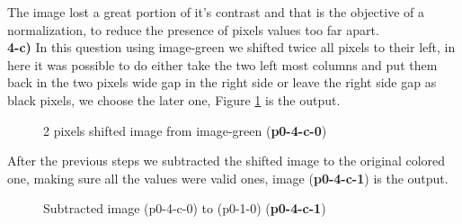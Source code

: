 \documentclass[12pt,a4paper]{article}
\begin{document}
The image lost a great portion of it's contrast and that is the objective of a normalization, to reduce the presence of pixels values too far apart.\\


\textbf{4-c) } In this question using image-green we shifted twice all pixels to their left, in here it was possible to do either take the two left most columns and put them back in the two pixels wide gap in the right side or leave the right side gap as black pixels, we choose the later one, Figure \ref{fig:p0-4-c-0} is the output.

\begin{figure}[!h]
	\centering
	{%
		\setlength{\fboxsep}{1pt}%
		\setlength{\fboxrule}{1pt}%
	}%
	\caption{2 pixels shifted image from image-green (\textbf{p0-4-c-0})}
	\label{fig:p0-4-c-0}
\end{figure}

After the previous steps we subtracted the shifted image to the original colored one, making sure all the values were valid ones, image (\textbf{p0-4-c-1}) is the output.

\begin{figure}[!h]
	\centering
	{%
		\setlength{\fboxsep}{1pt}%
		\setlength{\fboxrule}{1pt}%
	}%
	\caption{Subtracted image (p0-4-c-0) to (p0-1-0) (\textbf{p0-4-c-1})}
	\label{fig:p0-4-c-1}
\end{figure}
\end{document}

